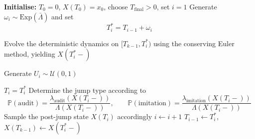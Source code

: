 \documentclass[11pt]{article}
\theoremstyle{plain}
\theoremstyle{definition}
\newcommand{\1}{\mathbf{1}}
\begin{document}
\begin{algorithm}
\caption{Simulation of the PDMP}
\label{alg:PDMP_sim}
\begin{algorithmic}[1]
\State \textbf{Initialise:} $T_0 = 0$, $X({T_0}) = x_0$, choose $T_{\mathrm{final}} > 0$, set $i = 1$
    \State Generate $\omega_i \sim \mathrm{Exp}(\bar\Lambda)$ and set
    \begin{equation*}
        T_i^\ast = T_{i-1} + \omega_i
    \end{equation*}

    \State Evolve the deterministic dynamics on $[T_{k-1}, T_i^\ast)$ using the conserving Euler method, yielding $X({T_i^\ast-})$

    \State Generate $U_i \sim \mathcal{U}(0,1)$

        \State $T_i = T_i^\ast$
        \State Determine the jump type according to
        \[
        \mathbb{P}(\text{audit}) = \frac{\lambda_{\mathrm{audit}}(X({T_i-}))}{\Lambda(X({T_i-}))}, 
        \qquad
        \mathbb{P}(\text{imitation}) = \frac{\lambda_{\mathrm{imitation}}(X({T_i-}))}{\Lambda(X({T_i-}))}
        \]
        \State Sample the post-jump state $X({T_i})$ accordingly
        \State $i \gets i+1$
    \Else
        \State $T_{i-1} \gets T_i^\ast$, \quad $X({T_{k-1}}) \gets X({T_i^\ast-})$
    \EndIf
\EndWhile
\end{algorithmic}
\end{algorithm}














\newpage
\printbibliography
\end{document}
